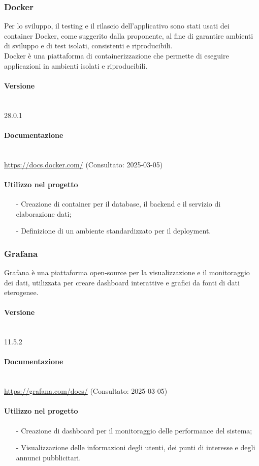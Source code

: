 \documentclass[10pt]{article}
\newcommand{\myparagraph}[1]{\paragraph{#1}\mbox{}\\\vspace{0.4em}}
\begin{document}
\begin{justify}
    \subsubsection{Docker}
    Per lo sviluppo, il testing e il rilascio dell'applicativo sono stati usati dei container Docker, come suggerito dalla proponente, al fine di garantire ambienti di sviluppo e di test isolati, consistenti e riproducibili.\\
    Docker è una piattaforma di containerizzazione che permette di eseguire applicazioni in ambienti isolati e riproducibili.
    
    \myparagraph{Versione}  
    28.0.1 %

    \myparagraph{Documentazione}
    \textcolor{blue}{\url{https://docs.docker.com/}} (Consultato: 2025-03-05)

    \paragraph{Utilizzo nel progetto}
    \begin{itemize}
        \item[-] Creazione di container per il database, il backend e il servizio di elaborazione dati;
        \item[-] Definizione di un ambiente standardizzato per il deployment.
    \end{itemize}

    \subsubsection{Grafana}
    Grafana è una piattaforma open-source per la visualizzazione e il monitoraggio dei dati, utilizzata per creare dashboard interattive e grafici da fonti di dati eterogenee.
    
    \myparagraph{Versione} 
    11.5.2 
    
    \myparagraph{Documentazione} 
    \textcolor{blue}{\url{https://grafana.com/docs/}} (Consultato: 2025-03-05)
    
    \paragraph{Utilizzo nel progetto}
    \begin{itemize}
        \item[-] Creazione di dashboard per il monitoraggio delle performance del sistema;
        \item[-] Visualizzazione delle informazioni degli utenti, dei punti di interesse e degli annunci pubblicitari.
    \end{itemize}


\end{justify}
\end{document}
